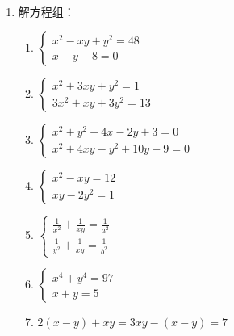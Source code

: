 \begin{enumerate}
\item 解方程组：
\begin{multicols}{2}
  \begin{enumerate}
\item $\begin{cases}x^{2}-x y+y^{2}=48 \\ x-y-8=0\end{cases}$
\item $\begin{cases}x^{2}+3 x y+y^{2}=1 \\ 3 x^{2}+x y+3 y^{2}=13\end{cases}$
\item $\begin{cases}x^{2}+y^{2}+4 x-2 y+3=0 \\ x^{2}+4 x y-y^{2}+10 y-9=0\end{cases}$
\item $\begin{cases}x^{2}-x y=12 \\ x y-2 y^{2}=1\end{cases}$
\item $\begin{cases}\frac{1}{x^{2}}+\frac{1}{x y}=\frac{1}{a^{2}}\\
    \frac{1}{y^{2}}+\frac{1}{x y}=\frac{1}{b^{2}}
\end{cases}$
\item $\begin{cases}x^{4}+y^{4}=97 \\ x+y=5\end{cases}$
\item $2(x-y)+x y=3 x y-(x-y)=7$
\end{enumerate}  
\end{multicols}

\end{enumerate}